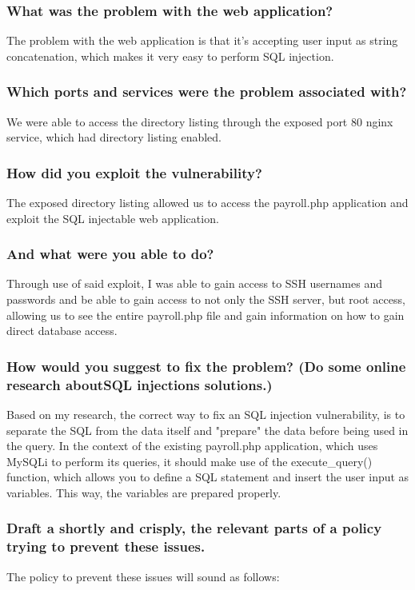 \subsubsection{What was the problem with the web application?}
The problem with the web application is that it's accepting user input as string concatenation, which makes it very easy to perform SQL injection.
\subsubsection{Which ports and services were the problem associated with?}
We were able to access the directory listing through the exposed port 80 nginx service, which had directory listing enabled.
\subsubsection{How did you exploit the vulnerability?}
The exposed directory listing allowed us to access the payroll.php application and exploit the SQL injectable web application.
\subsubsection{And what were you able to do?}
Through use of said exploit, I was able to gain access to SSH usernames and passwords and be able to gain access to not only the SSH server, but root access, allowing us to see the entire payroll.php file and gain information on how to gain direct database access.
\subsubsection{How would you suggest to fix the problem? (Do some online research aboutSQL injections solutions.)}
Based on my research, the correct way to fix an SQL injection vulnerability, is to separate the SQL from the data itself and "prepare" the data before being used in the query. In the context of the existing payroll.php application, which uses MySQLi to perform its queries, it should make use of the execute\_query() function, which allows you to define a SQL statement and insert the user input as variables. This way, the variables are prepared properly.
\subsubsection{Draft a shortly and crisply, the relevant parts of a policy trying to prevent these issues.}
The policy to prevent these issues will sound as follows:

